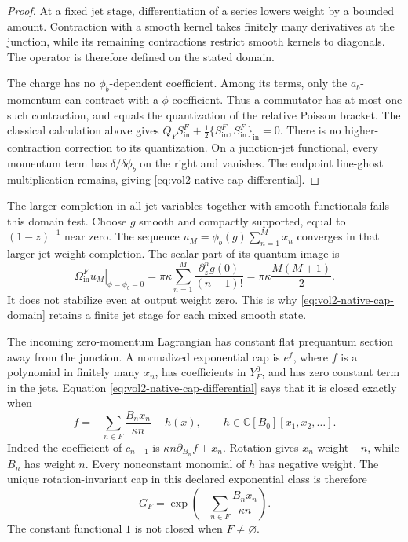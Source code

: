 \begin{proof}
At a fixed jet stage, differentiation of a series lowers weight by a
bounded amount. Contraction with a smooth kernel takes finitely many
derivatives at the junction, while its remaining contractions restrict
smooth kernels to diagonals. The operator is therefore defined on the
stated domain.

The charge has no \(\phi_b\)-dependent coefficient. Among its terms,
only the \(a_b\)-momentum can contract with a \(\phi\)-coefficient.
Thus a commutator has at most one such contraction, and equals the
quantization of the relative Poisson bracket. The classical calculation
above gives
\(Q_YS^F_{\mathrm{in}}+\tfrac12
\{S^F_{\mathrm{in}},S^F_{\mathrm{in}}\}_{\mathrm{in}}=0\).
There is no higher-contraction correction to its quantization.
On a junction-jet functional, every momentum term has
\(\delta/\delta\phi_b\) on the right and vanishes. The endpoint
line-ghost multiplication remains, giving
\eqref{eq:vol2-native-cap-differential}.
\end{proof}

The larger completion in all jet variables together with smooth
functionals fails this domain test. Choose \(g\) smooth and compactly
supported, equal to \((1-z)^{-1}\) near zero. The sequence
\(u_M=\phi_b(g)\sum_{n=1}^M x_n\) converges in that larger jet-weight
completion. The scalar part of its quantum image is
\[
 \left.\Omega^F_{\mathrm{in}}u_M\right|_{\phi=\phi_b=0}
      =\pi\kappa\sum_{n=1}^M
                      \frac{\partial_z^ng(0)}{(n-1)!}
      =\pi\kappa\frac{M(M+1)}2.
\]
It does not stabilize even at output weight zero. This is why
\eqref{eq:vol2-native-cap-domain} retains a finite jet stage for each
mixed smooth state.

The incoming zero-momentum Lagrangian has constant flat prequantum section
away from the junction. A normalized exponential cap is \(e^f\), where
\(f\) is a polynomial in finitely many \(x_n\), has coefficients in
\(Y_F^0\), and has zero constant term in the jets. Equation
\eqref{eq:vol2-native-cap-differential} says that it is closed exactly when
\[
 f=-\sum_{n\in F}\frac{B_nx_n}{\kappa n}+h(x),
 \qquad h\in\mathbb C[B_0][x_1,x_2,\ldots].
\]
Indeed the coefficient of \(c_{n-1}\) is
\(\kappa n\partial_{B_n}f+x_n\).
Rotation gives \(x_n\) weight \(-n\), while \(B_n\) has weight \(n\).
Every nonconstant monomial of \(h\) has negative weight.
The unique rotation-invariant cap in this declared exponential class is
therefore
\begin{equation}\label{eq:vol2-native-gaussian-cap}
                G_F=\exp\left(-\sum_{n\in F}\frac{B_nx_n}{\kappa n}\right).
\end{equation}
The constant functional \(1\) is not closed when \(F\ne\varnothing\).

